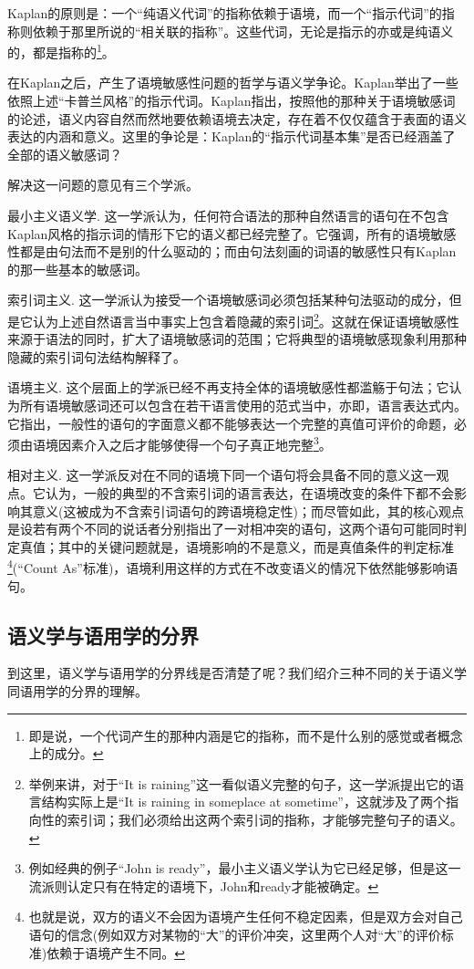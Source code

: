 \documentclass{article}
\begin{document}
Kaplan的原则是：一个“纯语义代词”的指称依赖于语境，而一个“指示代词”的指称则依赖于那里所说的“相关联的指称”。这些代词，无论是指示的亦或是纯语义的，都是指称的\footnote{即是说，一个代词产生的那种内涵是它的指称，而不是什么别的感觉或者概念上的成分。}。

在Kaplan之后，产生了语境敏感性问题的哲学与语义学争论。Kaplan举出了一些依照上述“卡普兰风格”的指示代词。Kaplan指出，按照他的那种关于语境敏感词的论述，语义内容自然而然地要依赖语境去决定，存在着不仅仅蕴含于表面的语义表达的内涵和意义。这里的争论是：Kaplan的“指示代词基本集”是否已经涵盖了全部的语义敏感词？

解决这一问题的意见有三个学派。

{\heiti 最小主义语义学.}
这一学派认为，任何符合语法的那种自然语言的语句在不包含Kaplan风格的指示词的情形下它的语义都已经完整了。它强调，所有的语境敏感性都是由句法而不是别的什么驱动的；而由句法刻画的词语的敏感性只有Kaplan的那一些基本的敏感词。

{\heiti 索引词主义.}
这一学派认为接受一个语境敏感词必须包括某种句法驱动的成分，但是它认为上述自然语言当中事实上包含着隐藏的索引词\footnote{举例来讲，对于“It is raining”这一看似语义完整的句子，这一学派提出它的语言结构实际上是“It is raining in someplace at sometime”，这就涉及了两个指向性的索引词；我们必须给出这两个索引词的指称，才能够完整句子的语义。}。这就在保证语境敏感性来源于语法的同时，扩大了语境敏感词的范围；它将典型的语境敏感现象利用那种隐藏的索引词句法结构解释了。

{\heiti 语境主义.}
这个层面上的学派已经不再支持全体的语境敏感性都滥觞于句法；它认为所有语境敏感词还可以包含在若干语言使用的范式当中，亦即，语言表达式内。它指出，一般性的语句的字面意义都不能够表达一个完整的真值可评价的命题，必须由语境因素介入之后才能够使得一个句子真正地完整\footnote{例如经典的例子“John is ready”，最小主义语义学认为它已经足够，但是这一流派则认定只有在特定的语境下，John和ready才能被确定。}。

{\heiti 相对主义.}
这一学派反对在不同的语境下同一个语句将会具备不同的意义这一观点。它认为，一般的典型的不含索引词的语言表达，在语境改变的条件下都不会影响其意义(这被成为不含索引词语句的{\heiti 跨语境稳定性})；而尽管如此，其的核心观点是设若有两个不同的说话者分别指出了一对相冲突的语句，这两个语句可能同时判定真值；其中的关键问题就是，语境影响的不是意义，而是真值条件的判定标准\footnote{也就是说，双方的语义不会因为语境产生任何不稳定因素，但是双方会对自己语句的信念(例如双方对某物的“大”的评价冲突，这里两个人对“大”的评价标准)依赖于语境产生不同。}(“Count As”标准)，语境利用这样的方式在不改变语义的情况下依然能够影响语句。
\subsection{语义学与语用学的分界}
到这里，语义学与语用学的分界线是否清楚了呢？我们绍介三种不同的关于语义学同语用学的分界的理解。
\end{document}
